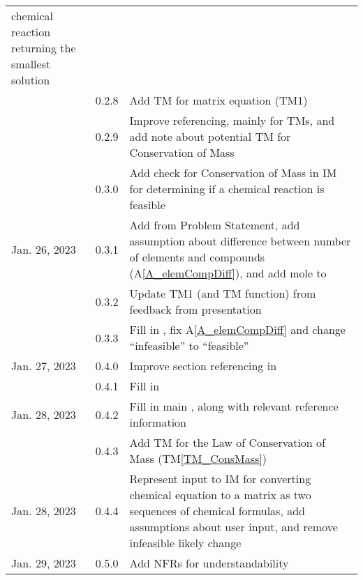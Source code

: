 \documentclass[12pt]{article}
\newcommand{\tmref}[1]{TM\ref{#1}}
\newcommand{\aref}[1]{A\ref{#1}}
\begin{document}
\begin{xltabular}{\textwidth}{llX}
  chemical reaction returning the smallest solution                                                          \\
  & 0.2.8         & Add TM for matrix equation (TM1)                        \\
  & 0.2.9         & Improve referencing, mainly for TMs, and add note about
  potential TM for Conservation of Mass                                                                      \\
  & 0.3.0         & Add check for Conservation of Mass
  in IM for determining if a chemical reaction is feasible                                                   \\
  Jan. 26, 2023       & 0.3.1         & Add  from Problem Statement, add
  assumption about difference between number of elements and compounds
  (\aref{A_elemCompDiff}), and add mole to                                                  \\
  & 0.3.2         & Update TM1 (and TM function) from feedback from
  presentation                                                                                               \\
  & 0.3.3         & Fill in , fix \aref{A_elemCompDiff} and
  change ``infeasible'' to ``feasible''                                                                      \\
  Jan. 27, 2023       & 0.4.0         & Improve section referencing in                  \\
  & 0.4.1         & Fill in                                        \\
  Jan. 28, 2023       & 0.4.2         & Fill in main , along with
  relevant reference information                                                                             \\
  & 0.4.3         & Add TM for the Law of Conservation of Mass
  (\tmref{TM_ConsMass})                                                                                      \\
  Jan. 28, 2023       & 0.4.4         & Represent input to IM for converting
  chemical equation to a matrix as two sequences of chemical
  formulas, add assumptions about user input, and remove infeasible
  likely change                                                                                              \\
  Jan. 29, 2023       & 0.5.0         & Add NFRs for understandability

\end{xltabular}
\end{document}
